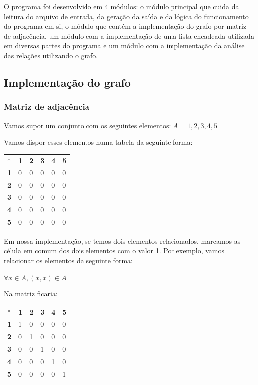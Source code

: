 \documentclass[12pt]{article}
\begin{document}
O programa foi desenvolvido em 4 módulos: o módulo principal que cuida da leitura
do arquivo de entrada, da geração da saída e da lógica do funcionamento do programa
em si, o módulo que contém a implementação do grafo por matriz de adjacência, um
módulo com a implementação de uma lista encadeada utilizada em diversas partes
do programa e um módulo com a implementação da análise das relações utilizando o grafo.

\subsection{Implementação do grafo}

\subsubsection{Matriz de adjacência}

Vamos supor um conjunto com os seguintes elementos: $A = {1,2,3,4,5}$

Vamos dispor esses elementos numa tabela da seguinte forma:

\begin{center}
\begin{tabular}{llllll}
* & \textbf{1} & \textbf{2} & \textbf{3} & \textbf{4} & \textbf{5}\\
\textbf{1} & 0 & 0 & 0 & 0 & 0\\
\textbf{2} & 0 & 0 & 0 & 0 & 0\\
\textbf{3} & 0 & 0 & 0 & 0 & 0\\
\textbf{4} & 0 & 0 & 0 & 0 & 0\\
\textbf{5} & 0 & 0 & 0 & 0 & 0
\end{tabular}
\end{center}

Em nossa implementação, se temos dois elementos relacionados, marcamos as célula em comum dos dois elementos com o valor 1. Por exemplo, vamos relacionar os elementos da seguinte forma:

$\forall x \in A, (x, x) \in A$

Na matriz ficaria:

\begin{center}
\begin{tabular}{llllll}
* & \textbf{1} & \textbf{2} & \textbf{3} & \textbf{4} & \textbf{5}\\
\textbf{1} & 1 & 0 & 0 & 0 & 0\\
\textbf{2} & 0 & 1 & 0 & 0 & 0\\
\textbf{3} & 0 & 0 & 1 & 0 & 0\\
\textbf{4} & 0 & 0 & 0 & 1 & 0\\
\textbf{5} & 0 & 0 & 0 & 0 & 1
\end{tabular}
\end{center}
\end{document}
